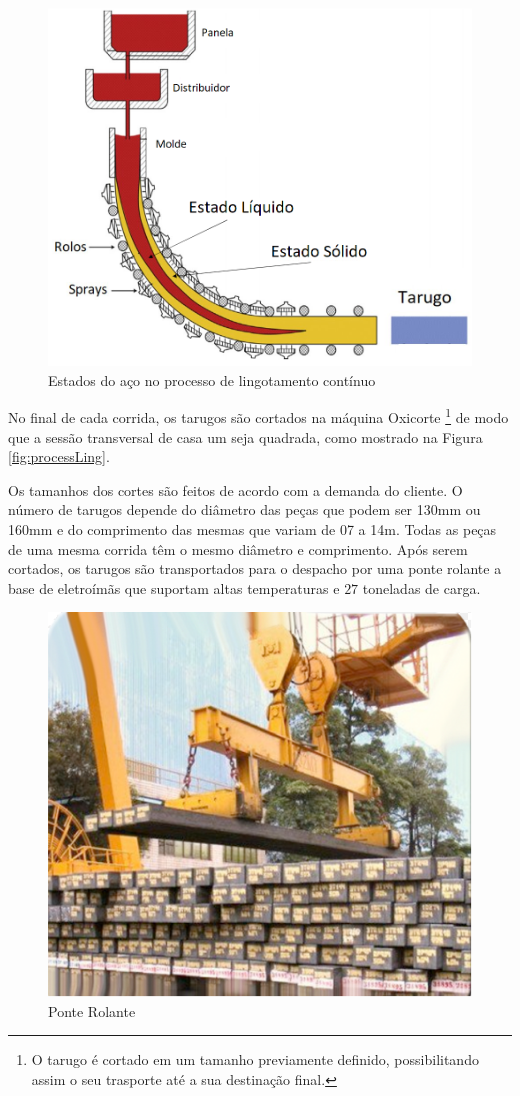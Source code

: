 \begin{figure}[hbt!]
	\centering
	\includegraphics[width=0.8\linewidth]{figuras/Steel/estadoSolidoLiq.png}
	\caption{Estados do aço no processo de lingotamento contínuo}
	\label{fig:processLingSolid}
\end{figure}

No final de cada corrida, os tarugos são cortados na máquina Oxicorte \footnote{O tarugo é cortado em um tamanho previamente definido, possibilitando assim o seu trasporte até a sua destinação final.} de modo que a sessão transversal de casa um seja quadrada, como mostrado na Figura \ref{fig:processLing}.  

Os tamanhos dos cortes são feitos de acordo com a demanda do cliente. O número de tarugos depende do diâmetro das peças que podem ser 130mm ou 160mm e do comprimento das mesmas que variam de 07 a 14m. Todas as peças de uma mesma corrida têm o mesmo diâmetro e comprimento. Após serem cortados, os tarugos são transportados para o despacho por uma ponte rolante a base de eletroímãs que suportam altas temperaturas e $27$ toneladas de carga. 


\begin{figure}[htbp]
	\centering
	\includegraphics[width=0.7\linewidth]{figuras/Steel/ponte_rolante.png}
	\caption{Ponte Rolante}
	\label{fig:crane}
\end{figure}

